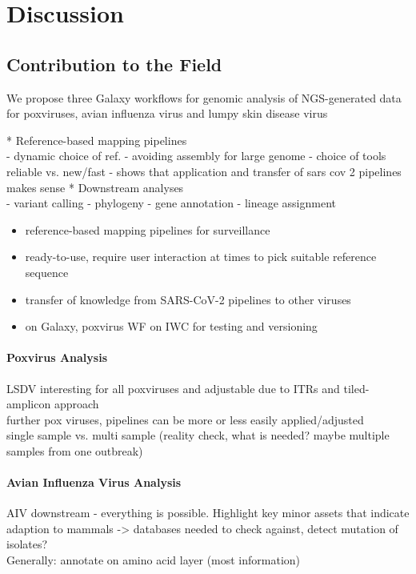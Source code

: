 \chapter{Discussion}\label{chap:discussion}
\todoit

\section{Contribution to the Field}
We propose three Galaxy workflows for genomic analysis of NGS-generated data for poxviruses, avian influenza virus and lumpy skin disease virus
\todoit

* Reference-based mapping pipelines\\
- dynamic choice of ref.
- avoiding assembly for large genome
- choice of tools reliable vs. new/fast
- shows that application and transfer of sars cov 2 pipelines makes sense
* Downstream analyses\\
- variant calling
- phylogeny
- gene annotation
- lineage assignment

\begin{itemize}
    \item reference-based mapping pipelines for surveillance
    \item ready-to-use, require user interaction at times to pick suitable reference sequence
    \item transfer of knowledge from SARS-CoV-2 pipelines to other viruses
    \item on Galaxy, poxvirus WF on IWC for testing and versioning
\end{itemize}

\subsubsection*{Poxvirus Analysis}
\ac{LSDV} interesting for all poxviruses and adjustable due to \acp{ITR} and tiled-amplicon approach \\
further pox viruses, pipelines can be more or less easily applied/adjusted \\
single sample vs. multi sample (reality check, what is needed? maybe multiple samples from one outbreak)


\subsubsection*{Avian Influenza Virus Analysis}
\ac{AIV} downstream - everything is possible. Highlight key minor assets that indicate adaption to mammals -> databases needed to check against, detect mutation of isolates? \\
Generally: annotate on amino acid layer (most information) \\

